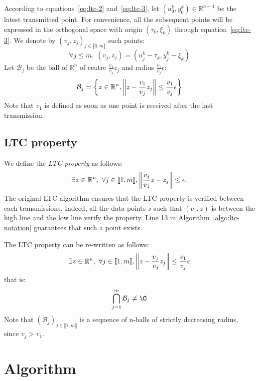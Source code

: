 According to equations~\eqref{eq:ltc-2} and~\eqref{eq:ltc-3}, let $(u_0^k,
y_0^k) \in \mathbb{R}^{n+1}$ be the latest transmitted point. For convenience,
all the subsequent points will be expressed in the orthogonal space with origin
$(\tau_k, \xi_k)$ through equation~\eqref{eq:ltc-3}. We denote by $(v_j, z_j)_{j
\in \llbracket 0, m \rrbracket}$ such points:
\begin{equation}
\forall j \leq m,\  (v_j, z_j) = (u_j^k - \tau_k, y_j^k - \xi_k)
\end{equation}
Let $\mathcal{B}_j$ be the ball of $\mathbb{R}^n$ of centre $\frac{v_1}{v_j}z_j$
and radius $\frac{v_1}{v_j}\epsilon$:
\begin{equation}
\mathcal{B}_j = \left\{ z \in \mathbb{R}^n,\left\lVert z-\frac{v_1}{v_j}z_j\right\rVert \leq\frac{v_1}{v_j}\epsilon \right\}
\end{equation}
Note that $v_1$ is defined as soon as one point is received after the last
transmission.

\subsection{LTC property}
\label{sec:ltc-property}

We define the \emph{LTC property} as follows:
\begin{equation}
\exists z \in \mathbb{R}^n, \ \forall j \in \llbracket 1, m \rrbracket, \left\lVert\frac{v_j}{v_1}z-z_j\right\rVert \leq
\epsilon.
\end{equation}
The original LTC algorithm ensures that the LTC property is
verified between each transmissions. Indeed, all the data points
$z$ such that $(v_1, z)$ is between the high line and the low line
verify the property. Line 13 in Algorithm~\ref{algo:ltc-notation} guarantees that
such a point exists.

The LTC property can be re-written as follows:
\begin{equation}
\exists z \in \mathbb{R}^n, \ \forall j \in \llbracket 1, m \rrbracket, \left\lVert z-\frac{v_1}{v_j}z_j\right\rVert \leq
\frac{v_1}{v_j}\epsilon
\end{equation}
that is:
\begin{equation}
\bigcap_{j=1}^m \mathcal{B}_j \neq \O
\label{eq:ltc-property}
\end{equation}
Note that $(\mathcal{B}_j)_{j \in \llbracket 1, m \rrbracket}$ is a sequence
of n-balls of strictly decreasing radius, since $v_j > v_1$.

\section{Algorithm}

